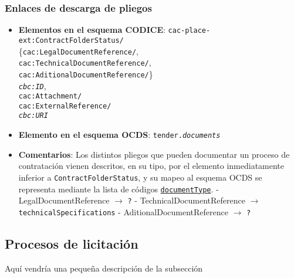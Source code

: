         \subsubsection{Enlaces de descarga de pliegos}
            \begin{itemize}
                \item \textbf{Elementos en el esquema CODICE}:
                    \tabto{7.7cm} \texttt{cac-place-ext:ContractFolderStatus/} \\
                    \tabto{7.7cm} \{\texttt{cac:LegalDocumentReference/}, \\
                    \tabto{7.7cm} \texttt{cac:TechnicalDocumentReference/}, \\
                    \tabto{7.7cm} \texttt{cac:AditionalDocumentReference/}\} \\
                    \tabto{7.7cm} \texttt{\textit{cbc:ID}},\\
                    \tabto{7.7cm} \texttt{cac:Attachment/} \\
                    \tabto{7.7cm} \texttt{cac:ExternalReference/} \\
                    \tabto{7.7cm} \texttt{\textit{cbc:URI}}
                \item \textbf{Elemento en el esquema OCDS}:
                    \tabto{7.7cm} \texttt{tender.\textit{documents}}
                \item \textbf{Comentarios}: Los distintos pliegos que pueden documentar un proceso de contratación vienen descritos, en su tipo, por el elemento inmediatamente inferior a \texttt{ContractFolderStatus}, y su mapeo al esquema OCDS se representa mediante la lista de códigos \href{https://standard.open-contracting.org/latest/es/schema/codelists/#document-type}{\texttt{documentType}}.
                        \subitem - LegalDocumentReference $\rightarrow$ \texttt{?}
                        \subitem - TechnicalDocumentReference $\rightarrow$ \texttt{technicalSpecifications}
                        \subitem - AditionalDocumentReference $\rightarrow$ \texttt{?}
            \end{itemize}

    \vspace{0.3cm}

    \subsection{Procesos de licitación}
    
        Aquí vendría una pequeña descripción de la subsección
    
